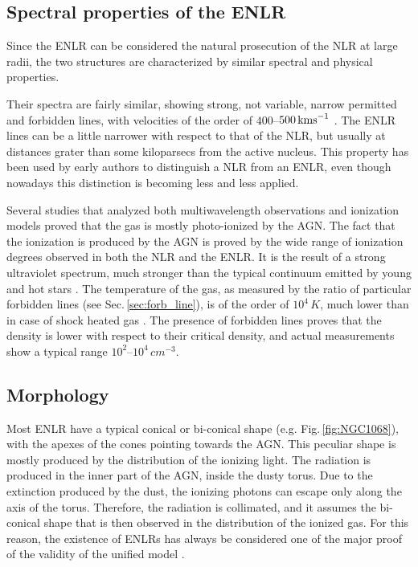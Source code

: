 \documentclass[../thesis.tex]{subfiles}
\begin{document}
\subsection{Spectral properties of the ENLR}

Since the ENLR can be considered the natural prosecution of the NLR at large radii, the two structures are characterized by similar spectral and physical properties.

Their spectra are fairly similar, showing strong, not variable, narrow permitted and forbidden lines, with velocities of the order of $400$--$500\,\si{\kms}$ \citep{Bennert04}. 
The ENLR lines can be a little narrower with respect to that of the NLR, but usually at distances grater than some kiloparsecs from the active nucleus.
This property has been used by early authors \citep[e.g.][]{Unger87} to distinguish a NLR from an ENLR, even though nowadays this distinction is becoming less and less applied.

Several studies that analyzed both multiwavelength observations and ionization models \citep[e.g.][]{Kraemer00,Kallman01} proved that the gas is mostly photo-ionized by the AGN.
The fact that the ionization is produced by the AGN is proved by the wide range of ionization degrees observed in both the NLR and the ENLR.
It is the result of a strong ultraviolet spectrum, much stronger than the typical continuum emitted by young and hot stars \citep{OsterbrockAGN}.
The temperature of the gas, as measured by the ratio of particular forbidden lines (see Sec.\,\ref{sec:forb_line}), is of the order of $10^4\,\si{K}$, much lower than in case of shock heated gas \citep[$T\sim 5\times10^4$ K][]{OsterbrockAGN}.
The presence of forbidden lines proves that the density is lower with respect to their critical density, and actual measurements show a typical range $10^2$--$10^4\,\si{cm^{-3}}$.

\subsection{Morphology}

Most ENLR have a typical conical or bi-conical shape (e.g. Fig.\,\ref{fig:NGC1068}), with the apexes of the cones pointing towards the AGN.
This peculiar shape is mostly produced by the distribution of the ionizing light.
The radiation is produced in the inner part of the AGN, inside the dusty torus.
Due to the extinction produced by the dust, the ionizing photons can escape only along the axis of the torus.
Therefore, the radiation is collimated, and it assumes the bi-conical shape that is then observed in the distribution of the ionized gas.
For this reason, the existence of ENLRs has always be considered one of the major proof of the validity of the unified model \citep{Wilson94,Schmitt03b,He18}.
\end{document}
